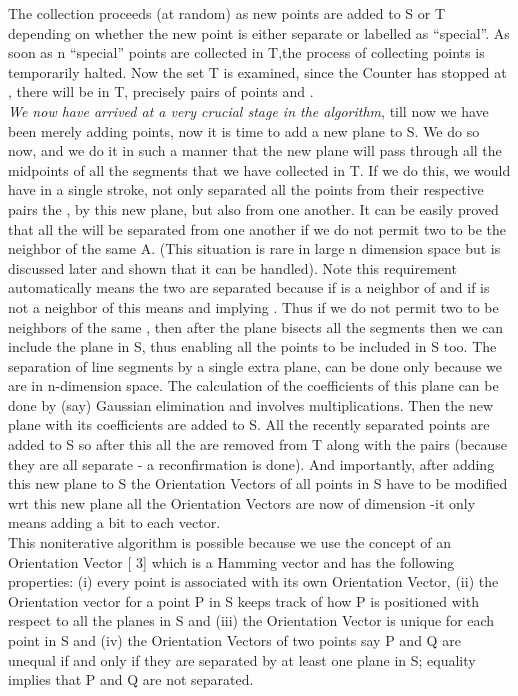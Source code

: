 \documentclass[english]{article}
\begin{document}
 The collection proceeds (at random) as new points are added to S or T depending on
whether the new point is either separate or labelled as {}``special''.
As soon as n {}``special'' points are collected in T,the process
of collecting points is temporarily halted. Now the set T is examined,
since the Counter has stopped at , there will be in T,
precisely  pairs of points  and .
\\
\emph{We now have arrived at a very crucial stage in the algorithm},
till now we have been merely adding points, now it is time to add
a new plane to S. We do so now, and we do it in such a manner that
the new plane will pass through all the midpoints  of all
the  segments  that we have collected in T. If
we do this, we would have in a single stroke, not only separated all
the  points  from their respective \textquotedbl{}pairs\textquotedbl{}
the , by this new plane, but also from one another. It can
be easily proved that all the  will be separated from one
another if we do not permit two  to be the neighbor of the same
A. (This situation is rare in large n dimension space but is discussed later 
and shown that it can be handled). Note this requirement automatically means the
two  are separated because if  is a neighbor of 
and if  is not a neighbor of  this means 
and  implying .
Thus if we do not permit two  to be neighbors of the same ,
then after the  plane bisects all the  segments then we
can include the  plane in S, thus enabling all the  points
 to be included in S too. The separation of 
line segments by a single extra plane, can be done only because we
are in n-dimension space. The calculation of the coefficients of this
 plane can be done by (say) Gaussian elimination and
involves  multiplications. Then the new plane with its
coefficients are added to S. All the  recently separated points
 are added to S so  after this all the
 are removed from T along with the pairs (because they are all
separate - a reconfirmation is done). And importantly, after adding
this  new plane to S the Orientation Vectors of all points in
S have to be modified wrt this new plane all the Orientation Vectors
are now of dimension  -it only means adding a bit to each vector.
\\
This noniterative algorithm is possible because we use the concept
of an Orientation Vector {[} 3{]} which is a Hamming vector and has
the following properties: (i) every point is associated with its own
Orientation Vector, (ii) the Orientation vector for a point P in S
keeps track of how P is positioned with respect to all the planes
in S and (iii) the Orientation Vector is unique for each point in
S and (iv) the Orientation Vectors of two points say P and Q are unequal
if and only if they are separated by at least one plane in S; equality
implies that P and Q are not separated.
\end{document}
